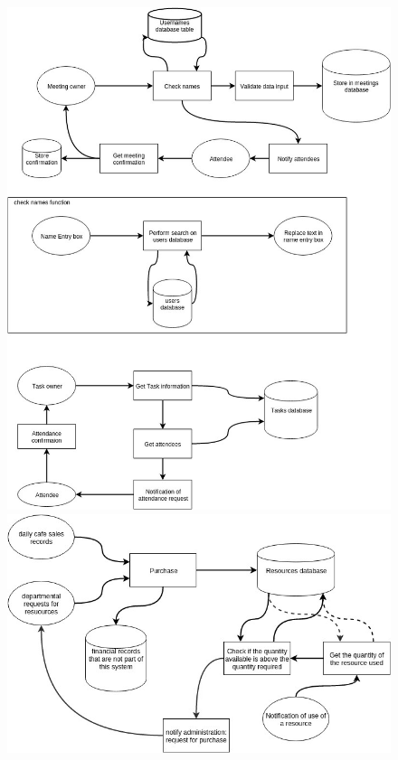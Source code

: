 \begin{figure}[H]
	\includegraphics[width=\textwidth]{./Analysis/diagrams/dfp1.jpg}
	\includegraphics[width=\textwidth]{./Analysis/diagrams/dfp2.jpg}

\end{figure}

